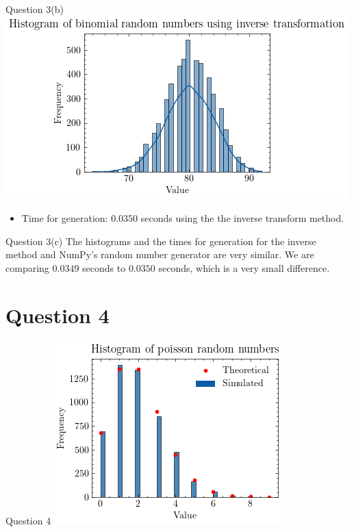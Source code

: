 \documentclass[compress,12pt]{beamer}
\begin{document}
\begin{frame}{Question 3(b)}
\centering
\includegraphics[scale=0.7]{imgs/binomialinverse.png}  \\
\begin{itemize}
    \item Time for generation: $0.0350$ seconds using the the inverse transform method.   
\end{itemize}
\end{frame}

\begin{frame}{Question 3(c)}
     The histograms and the times for generation for the inverse method and NumPy's random number generator are very similar. We are comparing {\color{red}$0.0349$} seconds to {\color{red}$0.0350$} seconds, which is a very small difference.
\end{frame}

\section{Question 4}
\begin{frame}{Question 4}
\centering
\includegraphics[scale=0.7]{imgs/poissonrv.png} 
\end{frame}
\end{document}
